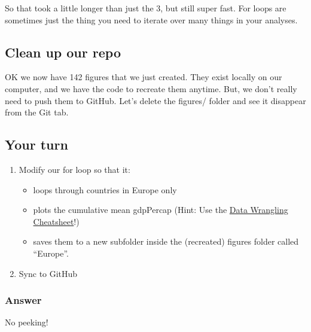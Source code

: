 \documentclass[]{book}
\providecommand{\tightlist}{%
  \setlength{\itemsep}{0pt}\setlength{\parskip}{0pt}}
\theoremstyle{definition}
\theoremstyle{definition}
\theoremstyle{definition}
\theoremstyle{remark}
\begin{document}
So that took a little longer than just the 3, but still super fast. For
loops are sometimes just the thing you need to iterate over many things
in your analyses.

\subsection{Clean up our repo}\label{clean-up-our-repo}

OK we now have 142 figures that we just created. They exist locally on
our computer, and we have the code to recreate them anytime. But, we
don't really need to push them to GitHub. Let's delete the figures/
folder and see it disappear from the Git tab.

\subsection{Your turn}\label{your-turn-12}

\begin{enumerate}
\def\labelenumi{\arabic{enumi}.}
\tightlist
\item
  Modify our for loop so that it:

  \begin{itemize}
  \tightlist
  \item
    loops through countries in Europe only
  \item
    plots the cumulative mean gdpPercap (Hint: Use the
    \href{https://www.rstudio.com/resources/cheatsheets/}{Data Wrangling
    Cheatsheet}!)
  \item
    saves them to a new subfolder inside the (recreated) figures folder
    called ``Europe''.
  \end{itemize}
\item
  Sync to GitHub
\end{enumerate}

\subsubsection{Answer}\label{answer-2}

No peeking!
\end{document}
